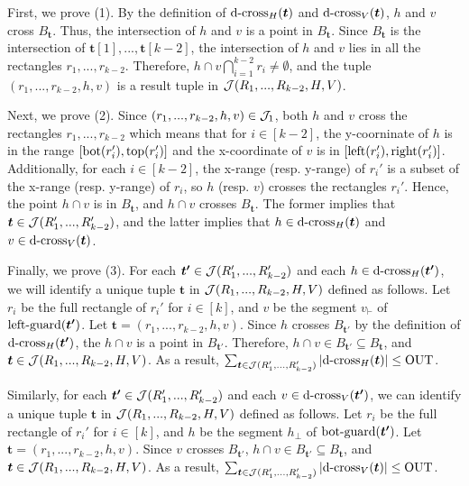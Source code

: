 First, we prove (1). By the definition of $\mathrm{d\text{-}cross}_H(\textrm{\boldmath${t}$})$ and $\mathrm{d\text{-}cross}_V(\textrm{\boldmath${t}$})$, $h$ and $v$ cross $B_\bm{t}$. Thus, the intersection of $h$ and $v$ is a point in $B_\bm{t}$. Since $B_\bm{t}$ is the intersection of $\bm{t}[1],...,\bm{t}[k-2]$, the intersection of $h$ and $v$ lies in all the rectangles $r_1,...,r_{k-2}$. Therefore, $h\cap v\bigcap_{i = 1}^{k-2}r_i \neq \emptyset$, and  the tuple $(r_1,...,r_{k-2},h,v)$ is a result tuple in $\mathcal{J}(R_1,...,R_{k-2},H,V)$. 

Next, we prove (2). Since $(r_1,...,r_{k-2},h,v)\in \mathcal{J}_1$, both $h$
 and $v$ cross the rectangles $r_1,...,r_{k-2}$ which means that for $i\in[k-2]$, the y-coorninate of $h$ is in the range $[\mathrm{bot}(r_i'), \mathrm{top}(r_i')]$ and the x-coordinate of $v$ is in $[\mathrm{left}(r_i'), \mathrm{right}(r_i')]$. Additionally, for each $i\in[k-2]$, the x-range (resp. y-range) of $r_i'$ is a subset of the x-range (resp. y-range) of $r_i$, so $h$ (resp. $v$) crosses the rectangles $r_i'$. Hence, the point $h \cap v$ is in $B_\bm{t}$, and $h \cap v$ crosses $B_{\bm{t}}$. The former implies that $\textrm{\boldmath${t}$} \in \mathcal{J}(R_1',...,R_{k-2}')$, and the latter implies that $h \in \mathrm{d\text{-}cross}_H(\textrm{\boldmath${t}$})$ and $v \in \mathrm{d\text{-}cross}_V(\textrm{\boldmath${t}$})$.

Finally, we prove (3). 
For each $\textrm{\boldmath${t'}$}\in  \mathcal{J}(R_1',...,R_{k-2}')$ and each $h \in \mathrm{d\text{-}cross}_H(\textrm{\boldmath${t'}$})$, we will identify a unique tuple $\bm{t}$ in $\mathcal{J}(R_1,...,R_{k-2},H,V)$ defined as follows. Let $r_i$ be the full rectangle of $r_i'$ for $i \in [k]$, and $v$ be the segment $v_\vdash$ of $\mathrm{left\text{-}guard}(\textrm{\boldmath${t'}$})$. Let $\bm{t} = (r_1,...,r_{k-2},h,v)$. Since $h$ crosses $B_{\bm{t'}}$ by the definition of $\mathrm{d\text{-}cross}_H(\textrm{\boldmath${t'}$})$, the $h\cap v$ is a point in $B_{\bm{t'}}$. 
Therefore, $h\cap v \in B_{\bm{t'}} \subseteq B_{\bm{t}}$, and $\textrm{\boldmath${t}$}\in \mathcal{J}(R_1,...,R_{k-2},H,V)$. As a result, $\sum_{\textrm{\boldmath${t}$}\in \mathcal{J}(R_1',...,R_{k-2}')}  |\mathrm{d\text{-}cross}_H(\textrm{\boldmath${t}$})| \leq \mathrm{OUT}$. 

Similarly, for each $\textrm{\boldmath${t'}$}\in  \mathcal{J}(R_1',...,R_{k-2}')$ and each $v \in \mathrm{d\text{-}cross}_V(\textrm{\boldmath${t'}$})$, we can identify a unique tuple $\bm{t}$ in $\mathcal{J}(R_1,...,R_{k-2},H,V)$ defined as follows. Let $r_i$ be the full rectangle of $r_i'$ for $i \in [k]$, and $h$ be the segment $h_\bot$ of $\mathrm{bot\text{-}guard}(\textrm{\boldmath${t'}$})$. Let $\bm{t} = (r_1,...,r_{k-2},h,v)$. Since $v$ crosses $B_{\bm{t'}}$, $h\cap v \in B_{\bm{t'}} \subseteq B_{\bm{t}}$, and $\textrm{\boldmath${t}$}\in \mathcal{J}(R_1,...,R_{k-2},H,V)$. As a result, $\sum_{\textrm{\boldmath${t}$}\in \mathcal{J}(R_1',...,R_{k-2}')}  |\mathrm{d\text{-}cross}_V(\textrm{\boldmath${t}$})| \leq \mathrm{OUT}$. 